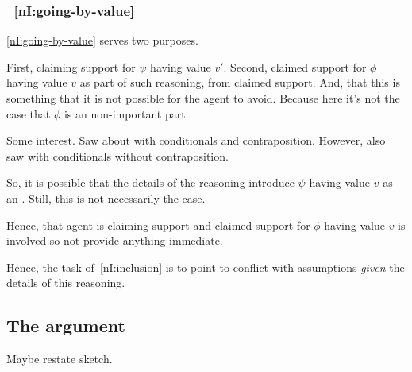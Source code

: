 \subsubsection{~\ref{nI:going-by-value}}

\begin{note}
  \ref{nI:going-by-value} serves two purposes.

  First, claiming support for \(\psi\) having value \(v'\).
  Second, claimed support for \(\phi\) having value \(v\) as part of such reasoning, from claimed support.
  And, that this is something that it is not possible for the agent to avoid.
  {
    \color{red} Because here it's not the case that \(\phi\) is an non-important part.
  }

  Some interest.
  Saw about with conditionals and contraposition.
  However, also saw with conditionals without contraposition.

  So, it is possible that the details of the reasoning introduce \(\psi\) having value \(v\) as an \expec{}.
  Still, this is not necessarily the case.

  Hence, that agent is claiming support and claimed support for \(\phi\) having value \(v\) is involved so not provide anything immediate.

  Hence, the task of~\ref{nI:inclusion} is to point to conflict with assumptions \emph{given} the details of this reasoning.
\end{note}

\subsection{The argument}

\begin{note}
  \color{red}
  Maybe restate sketch.
\end{note}


